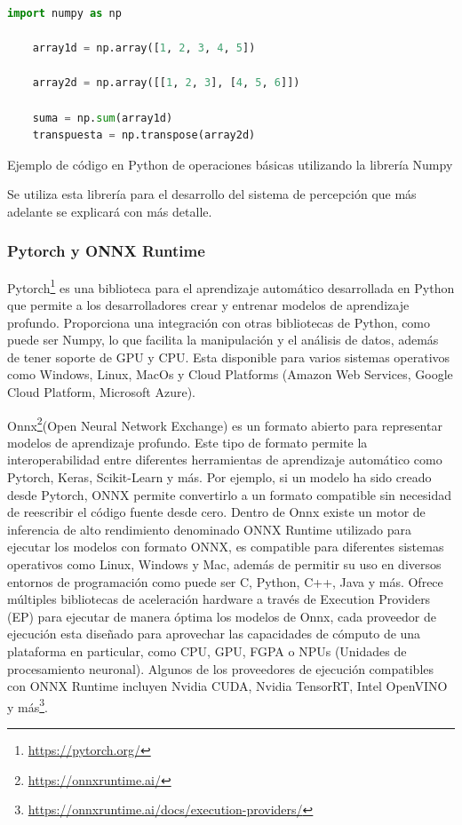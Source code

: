 \begin{code}[h]
  \begin{lstlisting}[language=Python]
    import numpy as np

    array1d = np.array([1, 2, 3, 4, 5])

    array2d = np.array([[1, 2, 3], [4, 5, 6]])

    suma = np.sum(array1d)  
    transpuesta = np.transpose(array2d)  
  \end{lstlisting}
  \caption[Ejemplo de código en Python de operaciones básicas utilizando la librería Numpy]{Ejemplo de código en Python de operaciones básicas utilizando la librería Numpy}
  \label{cod:Numpy}
  \end{code}  

Se utiliza esta librería para el desarrollo del sistema de percepción que más adelante se explicará con más detalle. 

\subsubsection{Pytorch y ONNX Runtime}
\label{sec:pytorchandonnx}
Pytorch\footnote{\url{https://pytorch.org/}} es una biblioteca para el aprendizaje automático desarrollada en Python que permite a 
los desarrolladores crear y entrenar modelos de aprendizaje profundo. Proporciona una integración con otras bibliotecas de Python, como puede ser
Numpy, lo que facilita la manipulación y el análisis de datos, además de tener soporte de GPU y CPU. Esta disponible para varios sistemas operativos 
como Windows, Linux, MacOs y Cloud Platforms (Amazon Web Services, Google Cloud Platform, Microsoft Azure).

Onnx\footnote{\url{https://onnxruntime.ai/}}(Open Neural Network Exchange) es un formato abierto para representar modelos de aprendizaje profundo. Este tipo de formato 
permite la interoperabilidad entre diferentes herramientas de aprendizaje automático como Pytorch, Keras, Scikit-Learn y más. Por ejemplo, si un modelo ha sido creado desde Pytorch, ONNX permite convertirlo 
a un formato compatible sin necesidad de reescribir el código fuente desde cero. Dentro de Onnx existe un motor de inferencia de alto rendimiento denominado ONNX Runtime utilizado 
para ejecutar los modelos con formato ONNX, es compatible para diferentes sistemas operativos como Linux, Windows y Mac, además de permitir su uso en diversos entornos de programación
como puede ser C, Python, C++, Java y más. Ofrece múltiples bibliotecas de aceleración hardware a través de Execution Providers (EP) para ejecutar de manera óptima los modelos de Onnx, cada proveedor de ejecución
esta diseñado para aprovechar las capacidades de cómputo de una plataforma en particular, como CPU, GPU, FGPA o NPUs (Unidades de procesamiento neuronal).
Algunos de los proveedores de ejecución compatibles con ONNX Runtime incluyen Nvidia CUDA, Nvidia TensorRT, Intel OpenVINO y más\footnote{\url{https://onnxruntime.ai/docs/execution-providers/}}. 

